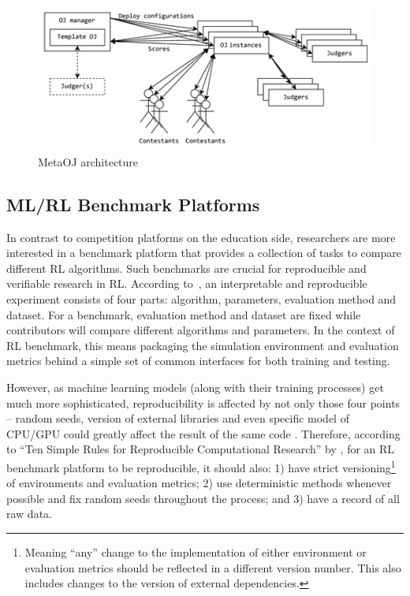 \begin{figure}[H]
    \centering
    \includegraphics{images/metaoj.png}
    \caption{MetaOJ architecture \parencite{metaoj}}
    \label{fig:metaoj}
\end{figure}

\subsection{ML/RL Benchmark Platforms}
\label{ss:intro-rl-benchmark-platforms}
In contrast to competition platforms on the education side, researchers are more interested in a benchmark platform that provides a collection of tasks to compare different RL algorithms. Such benchmarks are crucial for reproducible and verifiable research in RL. According to~\textcite{RN20}, an interpretable and reproducible experiment consists of four parts: algorithm, parameters, evaluation method and dataset. For a benchmark, evaluation method and dataset are fixed while contributors will compare different algorithms and parameters. In the context of RL benchmark, this means packaging the simulation environment and evaluation metrics behind a simple set of common interfaces for both training and testing.

However, as machine learning models (along with their training processes) get much more sophisticated, reproducibility is affected by not only those four points – random seeds, version of external libraries and even specific model of CPU/GPU could greatly affect the result of the same code \parencite{RN21}. Therefore, according to “Ten Simple Rules for Reproducible Computational Research” by \parencite{RN22}, for an RL benchmark platform to be reproducible, it should also: 1) have strict versioning\footnote{Meaning “any” change to the implementation of either environment or evaluation metrics should be reflected in a different version number. This also includes changes to the version of external dependencies.} of environments and evaluation metrics; 2) use deterministic methods whenever possible and fix random seeds throughout the process; and 3) have a record of all raw data.

